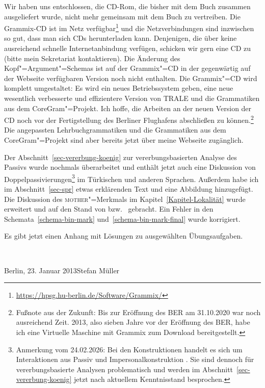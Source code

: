Wir haben uns entschlossen, die CD-Rom, die bisher mit dem Buch zusammen ausgeliefert wurde, nicht
mehr gemeinsam mit dem Buch zu vertreiben. Die Grammix-CD \citep{Mueller2007b} ist im Netz verfügbar\footnote{
  \url{https://hpsg.hu-berlin.de/Software/Grammix/}
} und die Netzverbindungen sind inzwischen so gut, dass man sich CDs herunterladen kann. Denjenigen,
die über keine ausreichend schnelle Internetanbindung verfügen, schicken wir gern eine CD zu (bitte
mein Sekretariat kontaktieren). 
Die Änderung des Kopf"=Argument"=Schemas ist auf der Grammix"=CD in der gegenwärtig auf der
Webseite verfügbaren Version noch nicht enthalten. Die Grammix"=CD
wird komplett umgestaltet: Es wird ein neues Betriebssystem geben, eine neue wesentlich verbesserte
und effizientere Version von TRALE und die Grammatiken aus dem CoreGram"=Projekt. Ich hoffe, die
Arbeiten an der neuen Version der CD noch vor der Fertigstellung des Berliner Flughafens abschließen
zu können.\footnote{Fußnote aus der Zukunft: Bis zur Eröffnung des BER am 31.10.2020 war noch
  ausreichend Zeit. 2013, also sieben Jahre vor der Eröffnung des BER, habe ich eine Virtuelle
  Maschine mit Grammix zum Download bereitgestellt.} Die angepassten Lehrbuchgrammatiken und die Grammatiken aus dem CoreGram"=Projekt sind
aber bereits jetzt über meine Webseite zugänglich.

Der Abschnitt~\ref{sec-vererbung-koenig} zur vererbungsbasierten Analyse des Passivs wurde nochmals
überarbeitet und enthält jetzt auch eine Diskussion von Doppelpassivierungen\footnote{
  Anmerkung vom 24.02.2026: Bei den Konstruktionen handelt es sich um Interaktionen aus Passiv und
  Impersonalkonstruktion \citep{Blevins2003a}. Sie sind dennoch für vererbungsbasierte Analysen
  problematisch und werden im Abschnitt~\ref{sec-vererbung-koenig} jetzt nach aktuellem Kenntnisstand besprochen.
} im Türkischen und
anderen Sprachen. Außerdem habe ich im Abschnitt~\ref{sec-spr} etwas erklärenden Text und eine
Abbildung hinzugefügt. Die Diskussion des \textsc{mother}"=Merkmals im Kapitel~\ref{Kapitel-Lokalität} wurde erweitert und auf
den Stand von  bzw.\  gebracht. 
Ein Fehler in den Schemata~\ref{schema-bin-mark} und~\ref{schema-bin-mark-final} wurde korrigiert.

Es gibt jetzt einen Anhang mit Lösungen zu ausgewählten Übungsaufgaben.


~\medskip

\noindent
Berlin, 23. Januar 2013\hfill Stefan Müller


